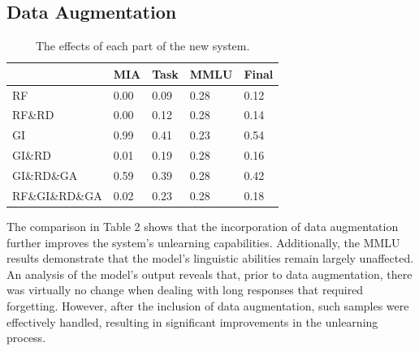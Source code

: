 \documentclass[11pt]{article}
\begin{document}
\subsection{Data Augmentation} 

\begin{table}[h]\footnotesize
  \centering
    \begin{tabular}{l|l|l|l|l}
    \hline
        ~ & MIA & Task & MMLU & Final \\ \hline
        RF & 0.00 & 0.09 & 0.28 & 0.12 \\ \hline
        RF\&RD & 0.00 & 0.12 & 0.28 & 0.14 \\ \hline
        GI & 0.99 & 0.41 & 0.23 & 0.54 \\ \hline
        GI\&RD & 0.01 & 0.19 & 0.28 & 0.16 \\ \hline
        GI\&RD\&GA & 0.59 & 0.39 & 0.28 & 0.42 \\ \hline
        RF\&GI\&RD\&GA & 0.02 & 0.23 & 0.28 & 0.18 \\ \hline
    \end{tabular}
  \caption{The effects of each part of the new system.}
  \label{tab:accents}
\end{table}
The comparison in Table 2 shows that the incorporation of data augmentation further improves the system's unlearning capabilities. Additionally, the MMLU results demonstrate that the model’s linguistic abilities remain largely unaffected. An analysis of the model's output reveals that, prior to data augmentation, there was virtually no change when dealing with long responses that required forgetting. However, after the inclusion of data augmentation, such samples were effectively handled, resulting in significant improvements in the unlearning process.
\end{document}
